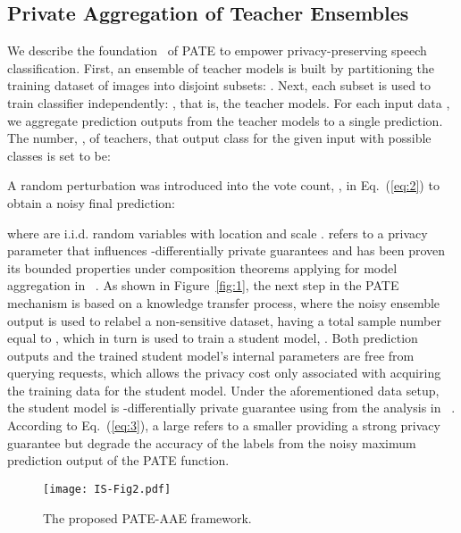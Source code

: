\documentclass[a4paper]{article}
\begin{document}
\subsection{Private Aggregation of Teacher Ensembles}

We describe the foundation~\cite{papernot2016semi, papernot2018scalable} of PATE to empower privacy-preserving speech classification. First, an ensemble of teacher models is built by partitioning the training dataset of images into  disjoint subsets: . Next, each subset is used to train  classifier independently: , that is, the teacher models. For each input data , we aggregate prediction outputs from the teacher models to a single prediction.
The number, , of teachers, that output class  for the given input  with  possible classes is set to be:

A random perturbation was introduced into the vote count, , in Eq.~(\ref{eq:2}) to obtain a noisy final prediction:

where  are i.i.d.  random variables with location  and scale .  refers to a privacy parameter that influences -differentially private guarantees and has been proven its bounded properties under composition theorems applying for model aggregation in ~\cite{papernot2016semi, papernot2018scalable}. As shown in Figure~\ref{fig:1}, the next step in the PATE mechanism is based on a knowledge transfer process, where the noisy ensemble output is used to relabel a non-sensitive dataset, having a total sample number equal to , which in turn is used to train a student model, . Both prediction outputs and the trained student model's internal parameters are free from querying requests, which allows the privacy cost only associated with acquiring the training data for the student model. Under the aforementioned data setup, the  student model is -differentially private guarantee using  from the analysis in ~\cite{papernot2016semi, papernot2018scalable}. According to Eq.~(\ref{eq:3}), a large  refers to a smaller  providing a strong privacy guarantee but degrade the accuracy of the labels from the noisy maximum prediction output of the PATE function.

\begin{figure}[ht!]
    \centering
    \texttt{[image: IS-Fig2.pdf]}
    \caption{The proposed PATE-AAE framework. }
    \label{fig:2}
\end{figure}
\end{document}
